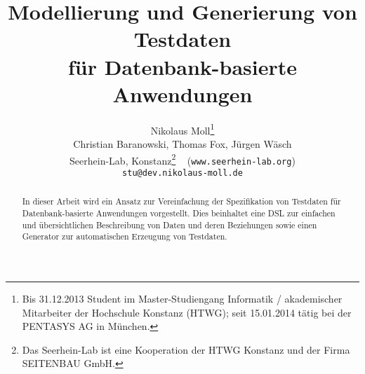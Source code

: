 \documentclass{lni}
\author{
	Nikolaus Moll\footnote{Bis 31.12.2013 Student im Master-Studiengang Informatik / akademischer Mitarbeiter der Hochschule Konstanz (HTWG); seit 15.01.2014 tätig bei der PENTASYS AG in München.}
\\ Christian Baranowski, Thomas Fox, Jürgen Wäsch \\ 
Seerhein-Lab, Konstanz\footnote{Das Seerhein-Lab ist eine Kooperation der HTWG Konstanz und der Firma SEITENBAU GmbH.} \texttt{ } (\texttt{www.seerhein-lab.org})\\ 
           \texttt{stu@dev.nikolaus-moll.de}
}
\title{Modellierung und Generierung von Testdaten\\ für Datenbank-basierte Anwendungen}
\begin{document}
\maketitle




\begin{abstract}
%
In dieser Arbeit wird ein Ansatz zur Vereinfachung der Spezifikation von Testdaten für Datenbank-basierte Anwendungen vorgestellt. 
%
Dies beinhaltet eine DSL zur einfachen und übersichtlichen Beschreibung von Daten und deren Beziehungen sowie einen Generator zur automatischen Erzeugung von Testdaten. 


\end{abstract}
















\end{document}
